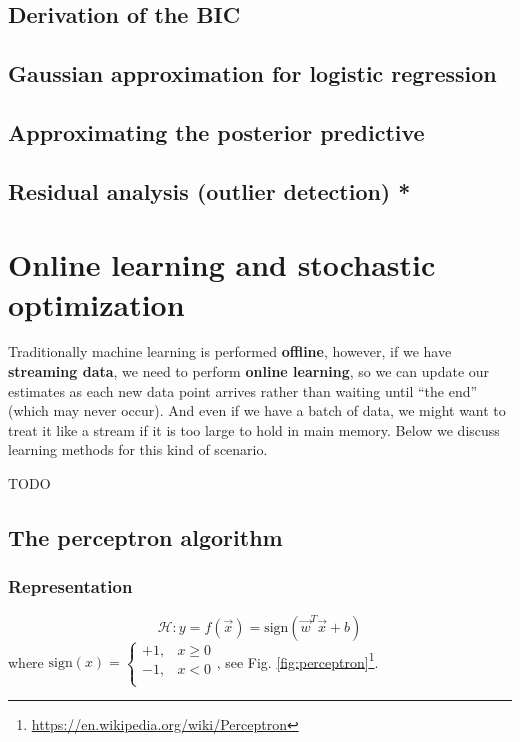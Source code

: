 \subsection{Derivation of the BIC}


\subsection{Gaussian approximation for logistic regression}
\label{sec:Gaussian-approximation-for-logistic-regression}


\subsection{Approximating the posterior predictive}


\subsection{Residual analysis (outlier detection) *}


\section{Online learning and stochastic optimization}
Traditionally machine learning is performed \textbf{offline}, however, if we have \textbf{streaming data}, we need to perform \textbf{online learning}, so we can update our estimates as each new data point arrives rather than waiting until “the end” (which may never occur). And even if we have a batch of data, we might want to treat it like a stream if it is too large to hold in main memory. Below we discuss learning methods for this kind of scenario.

TODO


\subsection{The perceptron algorithm}

\subsubsection{Representation}
\begin{equation}
\mathcal{H}:y=f(\vec{x})=\text{sign}(\vec{w}^T\vec{x}+b)
\end{equation}
where $\text{sign}(x)=\begin{cases}+1, & x \geq 0\\-1, & x<0\\\end{cases}$, see Fig. \ref{fig:perceptron}\footnote{\url{https://en.wikipedia.org/wiki/Perceptron}}.

